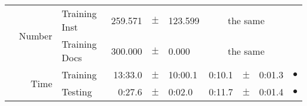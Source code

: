 \begin{longtable}{|r|r|l||rcl|rcl|c|}
\cline{2-10} & \multirow{2}{*}{    Number} &   Training Inst &     259.571 &  $\pm$  &     123.599 &    \multicolumn{3}{c|}{the same}         &  \\
\cline{3-10} &                             &   Training Docs &     300.000 &  $\pm$  &       0.000 &    \multicolumn{3}{c|}{the same}         &  \\
\cline{2-10} & \multirow{2}{*}{      Time} &        Training &     13:33.0 &  $\pm$  &     10:00.1 &      0:10.1 &  $\pm$  &      0:01.3 & $\bullet$ \\
\cline{3-10} &                             &         Testing &      0:27.6 &  $\pm$  &      0:02.0 &      0:11.7 &  $\pm$  &      0:01.4 & $\bullet$ \\
\hline
\end{longtable}


